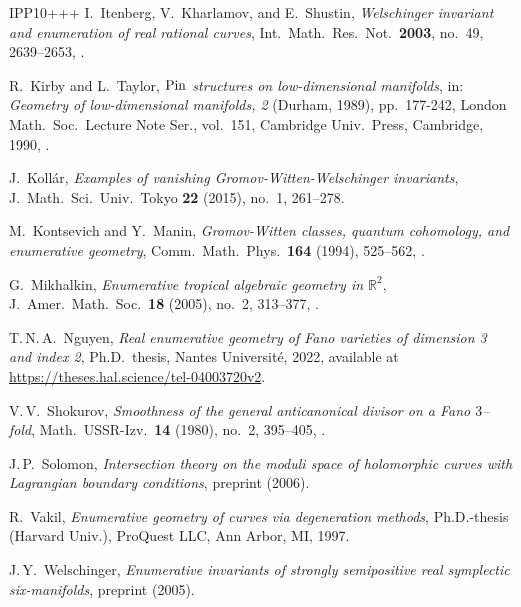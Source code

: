 \documentclass[11pt]{amsart}
\numberwithin{equation}{section}
\theoremstyle{definition}
\theoremstyle{plain}
\theoremstyle{remark}
\begin{document}
\begin{thebibliography}{IPP{\etalchar{+}}10+++}
I.~Itenberg, V.~Kharlamov, and E.~Shustin, \emph{Welschinger invariant and
  enumeration of real rational curves}, Int.\ Math.\ Res.\ Not.\ \textbf{2003}, no.~49, 2639--2653, .

R.~Kirby and L.~Taylor, \emph{${\rm Pin}$ structures on low-dimensional manifolds}, in: \emph{Geometry of low-dimensional manifolds, 2} ({D}urham, 1989), pp.~177-242, London Math.\ Soc.\ Lecture Note Ser., vol.~151, Cambridge Univ.\ Press, Cambridge, 1990, .

J.~Koll\'{a}r, \emph{Examples of vanishing {G}romov-{W}itten-{W}elschinger
  invariants}, J.~Math.\ Sci.\ Univ.\ Tokyo \textbf{22} (2015), no.~1, 261--278.

M.~Kontsevich and Y.~Manin, \emph{Gromov-{W}itten classes, quantum cohomology,
  and enumerative geometry}, Comm.\ Math.\ Phys.\ \textbf{164} (1994), 525--562,
.

G.~Mikhalkin, \emph{Enumerative tropical algebraic geometry in $\mathbb{R}^2$},
  J.~Amer.\ Math.\ Soc.\ \textbf{18} (2005), no.~2, 313--377, 
.

  T.\,N.\,A.~Nguyen, \emph{Real enumerative geometry of {F}ano varieties of dimension 3 and index 2}, Ph.D.~thesis, Nantes Universit{\'e}, 2022, available at \url{https://theses.hal.science/tel-04003720v2}.

V.\,V.~Shokurov, \emph{Smoothness of the general anticanonical divisor on a
  {F}ano $3$--fold}, Math.\ USSR-Izv.\ \textbf{14} (1980),
  no.~2, 395--405, 
.

J.\,P.~Solomon, \emph{Intersection theory on the moduli space of holomorphic
  curves with Lagrangian boundary conditions}, preprint 
  (2006).

R.~Vakil, \emph{Enumerative geometry of curves via degeneration methods},
Ph.D.-thesis (Harvard Univ.), ProQuest LLC, Ann Arbor, MI, 1997.

J.\,Y.~Welschinger, \emph{Enumerative invariants of strongly semipositive real
  symplectic six-manifolds}, preprint  (2005).


\end{thebibliography}
\end{document}
